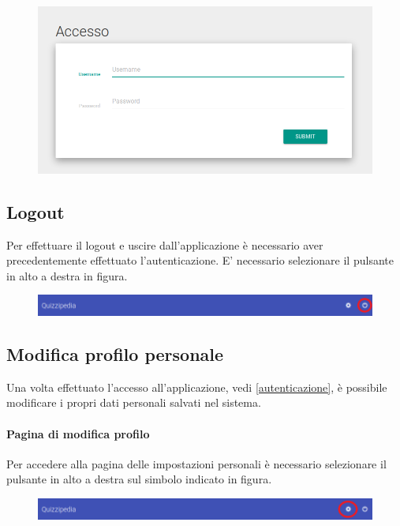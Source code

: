 \documentclass[12pt,a4paper]{article}
\begin{document}
		\begin{figure}[h]
		
		\centering
		\includegraphics[width=0.8\linewidth]{../img/screenshot/loginCrop.png}
		\caption{}
		\label{Schermata di autenticazione}
		\end{figure}
		
		
	\subsection{Logout}
	Per effettuare il logout e uscire dall'applicazione è necessario aver precedentemente effettuato l'autenticazione.
	E' necessario selezionare il pulsante in alto a destra in figura.
	\begin{figure}[h]	
		\centering
		\includegraphics[width=1.0\linewidth]{../img/screenshot/barraLogout.png}
		\caption{}
		\label{Pulsante di logout}
	\end{figure}

	\subsection{Modifica profilo personale}
	Una volta effettuato l'accesso all'applicazione, vedi \ref{autenticazione}, è possibile modificare i propri dati personali salvati nel sistema.
    
	\paragraph{Pagina di modifica profilo}
	Per accedere alla pagina delle impostazioni personali è necessario selezionare il pulsante in alto a destra sul simbolo indicato in figura.
	
	\begin{figure}[h]
		\centering
		\includegraphics[width=1.0\linewidth]{../img/screenshot/barraImpostaz.png}
		\caption{}
		\label{Pulsante di logout}
	\end{figure}
	
\end{document}
